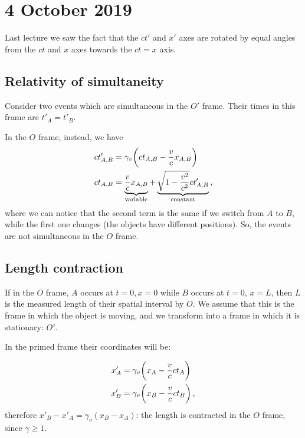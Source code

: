 \documentclass[main.tex]{subfiles}
\begin{document}
\section*{4 October 2019}

Last lecture we saw the fact that the \(ct'\) and \(x'\) axes are rotated by equal angles from the \(ct\) and \(x\) axes towards the \(ct=x\) axis.

\subsection{Relativity of simultaneity}

Consider two events which are simultaneous in the \(O'\) frame. Their times in this frame are \(t'_A = t'_B\).

In the \(O\) frame, instead, we have 
%
\begin{subequations}
\begin{align} 
  ct^{\prime }_{A, B} &= \gamma_{v} \qty(ct_{A, B} - \frac{v}{c} x_{A, B}) \\
  ct_{A, B} &= \underbrace{ \frac{v}{c} x_{A, B}}_{\text{variable}} + \underbrace{\sqrt{1- \frac{v^2}{c^2} } c t_{A, B}'}_{\text{constant}}
\,,
\end{align}
\end{subequations}
%
where we can notice that the second term is the same if we switch from \(A\) to \(B\), while the first one changes (the objects have different positions). 
So, the events are not simultaneous in the \(O\) frame.

\subsection{Length contraction}

If in the \(O\) frame, \(A\) occurs at \(t = 0, x = 0\) while \(B\) occurs at \(t=0\), \(x=L\), then \(L\) is the measured length of their spatial interval by \(O\). We assume that this is the frame in which the object is moving, and we transform into a frame in which it is stationary: \(O'\).

In the primed frame their coordinates will be:

\begin{subequations}
\begin{align}
  x'_A &= \gamma_v \qty(x_A - \frac{v}{c} c t_A) \\
  x'_B &= \gamma_v \qty(x_B - \frac{v}{c} c t_B) \,,
\end{align}
\end{subequations}
%
therefore \(x'_B - x'_A = \gamma_v (x_B - x_A)\): the length is contracted in the \(O\) frame, since \(\gamma\geq 1\).
\end{document}
